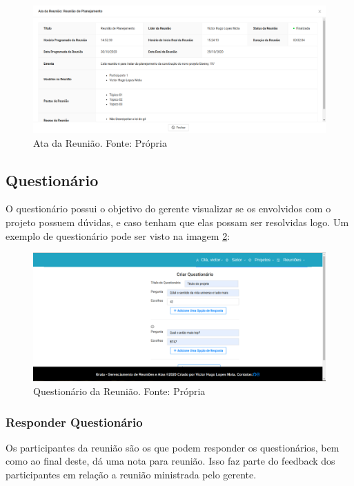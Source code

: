 \begin{figure}[H]
    \centering
    \includegraphics[width=1.0\textwidth]{figuras/visualizar_ata.png}
    \caption{Ata da Reunião. Fonte: Própria}
    \label{img:ata_reuniao}
\end{figure}

\subsection{Questionário}

O questionário possui o objetivo do gerente visualizar se os envolvidos com o projeto possuem dúvidas, e caso tenham que elas possam ser resolvidas logo. Um exemplo de questionário pode ser visto na imagem \ref{img:questionario_reuniao}:

\begin{figure}[H]
    \centering
    \includegraphics[width=1.0\textwidth]{figuras/questionario_reuniao.png}
    \caption{Questionário da Reunião. Fonte: Própria}
    \label{img:questionario_reuniao}
\end{figure}

\subsubsection{Responder Questionário}

Os participantes da reunião são os que podem responder os questionários, bem como ao final deste, dá uma nota para reunião. Isso faz parte do feedback dos participantes em relação a reunião ministrada pelo gerente.

